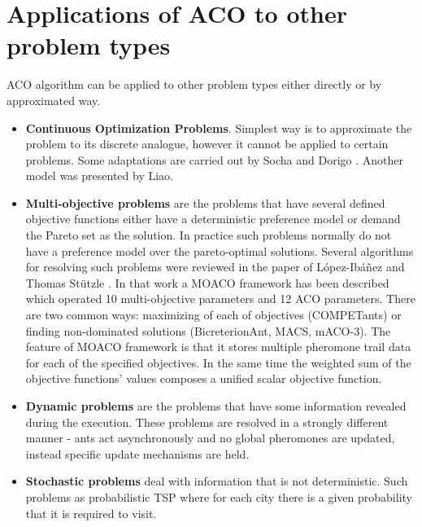 \section{Applications of ACO to other problem types}
ACO algorithm can be applied to other problem types either directly or by approximated way.

\begin{itemize}
\item \textbf{Continuous Optimization Problems}. Simplest way is to approximate the problem to its discrete analogue, however it cannot be applied to certain problems. Some adaptations are carried out by Socha and Dorigo \cite{aco_continuous}. Another model was presented by Liao\cite{aco_incremental}.

\item \textbf{Multi-objective problems} are the problems that have several defined objective functions either have a deterministic preference model or demand the Pareto set as the solution. In practice such problems normally do not have a preference model over the pareto-optimal solutions. Several algorithms for resolving such problems were reviewed in the paper of L{\'o}pez-Ib{\'a}{\~n}ez and Thomas St{\"u}tzle \cite{moaco}. In that work a MOACO framework has been described which operated 10 multi-objective parameters and 12 ACO parameters. There are two common ways: maximizing of each of objectives (COMPETants) or finding non-dominated solutions (BicreterionAnt, MACS, mACO-3). The feature of MOACO framework is that it stores multiple pheromone trail data for each of the specified objectives. In the same time the weighted sum of the objective functions' values composes a unified scalar objective function.

\item \textbf{Dynamic problems} are the problems that have some information revealed during the execution. These problems are resolved in a strongly different manner - ants act asynchronously and no global pheromones are updated, instead specific update mechanisms are held.

\item \textbf{Stochastic problems} deal with information that is not deterministic. Such problems as probabilistic TSP where for each city there is a given probability that it is required to visit.
\end{itemize}
